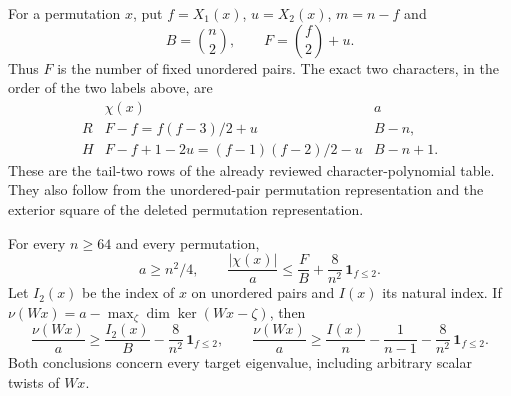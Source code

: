 For a permutation \(x\), put \(f=X_1(x)\), \(u=X_2(x)\), \(m=n-f\)
and
\[
 B=\binom n2,\qquad F=\binom f2+u.
 \tag{FT2P.2}
\]
Thus \(F\) is the number of fixed unordered pairs.  The exact two
characters, in the order of the two labels above, are
\[
 \begin{array}{c|c|c}
 &\chi(x)&a\\ \hline
 R&F-f=f(f-3)/2+u&B-n,\\
 H&F-f+1-2u=(f-1)(f-2)/2-u&B-n+1.
 \end{array}
 \tag{FT2P.3}
\]
These are the tail-two rows of the already reviewed character-polynomial
table.\cite[Table~5.1, p.~31; Proposition~I.1 and proof]{HD:GarsiaGoupil2009}
They also follow from the unordered-pair permutation representation and
the exterior square of the deleted permutation representation.

\begin{lemma}[HD-FT13]
For every \(n\ge64\) and every permutation,
\[
 a\ge n^2/4,\qquad
 \frac{|\chi(x)|}{a}\le \frac FB+
                      \frac8{n^2}\,\mathbf1_{f\le2}.
 \tag{FT2P.4}
\]
Let \(I_2(x)\) be the index of \(x\) on unordered pairs and
\(I(x)\) its natural index.  If
\(\nu(Wx)=a-\max_\zeta\dim\ker(Wx-\zeta)\), then
\[
 \frac{\nu(Wx)}a\ge\frac{I_2(x)}B-
                  \frac8{n^2}\,\mathbf1_{f\le2},\qquad
 \frac{\nu(Wx)}a\ge\frac{I(x)}n-
                  \frac1{n-1}-\frac8{n^2}\,\mathbf1_{f\le2}.
 \tag{FT2P.5}
\]
Both conclusions concern every target eigenvalue, including arbitrary
scalar twists of \(Wx\).
\end{lemma}

